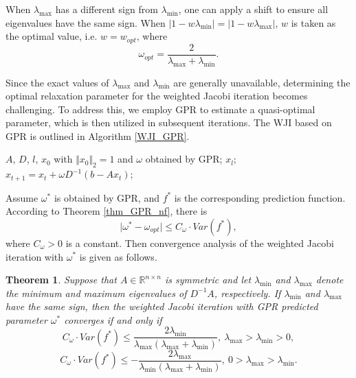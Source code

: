 \documentclass[preprint,review,sort&compress,3p]{elsarticle}
\newtheorem{thm}{Theorem }[section]
\begin{document}
When $\lambda_{\max}$ has a different sign from $\lambda_{\min}$, one can apply a shift to ensure all eigenvalues have the same sign.
When $\left\vert 1-w\lambda_{\min} \right\vert = \left\vert 1-w\lambda_{\max} \right\vert$, $w$ is taken as the optimal value, i.e. $w = w_{opt}$, where
$$
\omega_{opt} = \frac{2}{\lambda_{\max}+\lambda_{\min}}. 
$$



Since the exact values of $\lambda_{\max}$ and $\lambda_{\min}$ are generally unavailable, determining the optimal relaxation parameter for the weighted Jacobi iteration becomes challenging. 
To address this, we employ GPR to estimate a quasi-optimal parameter, which is then utilized in subsequent iterations. The { WJI based on GPR} is outlined in Algorithm \ref{WJI_GPR}.

\begin{algorithm}
	\caption{The WJI based on GPR}
	\label{alg1}
	\label{WJI_GPR}
	\begin{algorithmic}[1]
		\Require $A$, $D$, $l$, $x_0$ with $\Vert x_0 \Vert_2 = 1$ and $\omega$ obtained by GPR;
		\Ensure $x_{l}$;
		\State $x_{t+1} = x_t+\omega D^{-1}(b-Ax_t)$;
		\EndFor
	\end{algorithmic}
\end{algorithm}


Assume $\omega^*$ is obtained by GPR, and $f^*$ is the corresponding prediction function. According to Theorem \ref{thm_GPR_nf}, there is 
\begin{equation}
	\vert \omega^*-\omega_{opt}\vert \le C_\omega \cdot Var(f^*), 
\end{equation}
where $C_\omega>0$ is a constant. Then convergence analysis of the weighted Jacobi iteration with $\omega^*$ is given as follows. 

\begin{thm}
	\label{GPR_Jacobi_convergence}
	Suppose that $A\in \mathbb{R}^{n\times n}$ is symmetric and let $\lambda_{\min}$ and $\lambda_{\max}$ denote the minimum and maximum eigenvalues of $D^{-1}A$, respectively. If $\lambda_{\min}$ and $\lambda_{\max}$ have the same sign, then the weighted Jacobi iteration with GPR predicted parameter $\omega^*$ converges if and only if 
	\begin{equation}
		\label{convergence_1}
		C_\omega \cdot Var(f^*) \le \frac{2\lambda_{\min}}{\lambda_{\max}(\lambda_{\max}+\lambda_{\min})}, ~ \lambda_{\max}>\lambda_{\min}>0,
	\end{equation}
	\begin{equation}
		\label{convergence_2}
		C_\omega \cdot Var(f^*)\le -\frac{2\lambda_{\max}}{\lambda_{\min}(\lambda_{\max}+\lambda_{\min})}, ~ 0>\lambda_{\max}>\lambda_{\min}.
	\end{equation}
\end{thm}
\end{document}

